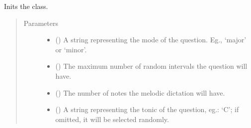 \documentclass[letterpaper,10pt,english]{sphinxmanual}
\begin{document}
\begin{fulllineitems}
\begin{fulllineitems}
\label{\detokenize{index:birdears.questions.melodicdictation.MelodicDictationQuestion.__init__}}
\sphinxAtStartPar
Inits the class.
\begin{quote}\begin{description}
\item[{Parameters}] \leavevmode\begin{itemize}
\item {} 
\sphinxAtStartPar
{} () \textendash{} A string representing the mode of the question.
Eg., ‘major’ or ‘minor’.

\item {} 
\sphinxAtStartPar
{} () \textendash{} The maximum number of random intervals
the question will have.

\item {} 
\sphinxAtStartPar
{} () \textendash{} The number of notes the melodic dictation will have.

\item {} 
\sphinxAtStartPar
{} () \textendash{} A string representing the tonic of the question,
eg.: ‘C’; if omitted, it will be selected randomly.


\end{itemize}
\end{description}
\end{quote}
\end{fulllineitems}
\end{fulllineitems}
\end{document}
